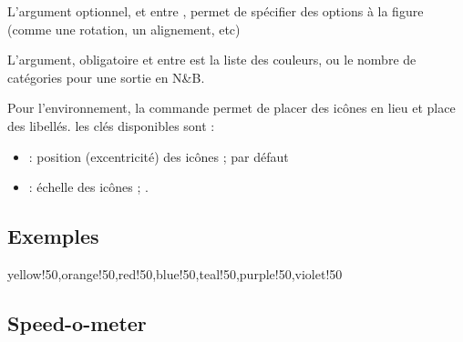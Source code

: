 \documentclass[french,11pt,a4paper]{article}
\begin{document}
L'argument optionnel, et entre , permet de spécifier des options à la figure  (comme une rotation, un alignement, etc)

\smallskip

L'argument, obligatoire et entre  est la liste des couleurs, ou le nombre de catégories pour une sortie en N\&B.

\medskip

Pour l'environnement, la commande  permet de placer des icônes en lieu et place des libellés. les clés disponibles sont :

\begin{itemize}
	\item {} :  position (excentricité) des icônes ;  par défaut
	\item {} : échelle des icônes ; .
\end{itemize}

\subsection{Exemples}

\begin{DemoCode}{}
%
\end{DemoCode}

\begin{DemoCode}{}
\end{DemoCode}

\begin{DemoCode}{}
\begin{EnvRoueNiveaux}[Rayon=5cm,Marqueur=5.85]%
		{yellow!50,orange!50,red!50,blue!50,teal!50,purple!50,violet!50}
	\PlacerIconesNiveaux[Echelle=3]%
		{\faPython,\faAdjust,\faAngellist,\faAmbulance,\faAdjust,\faBabyCarriage,\faBlender}
\end{EnvRoueNiveaux}
\end{DemoCode}

\pagebreak

\subsection{\og Speed-o-meter \fg}
\end{document}
